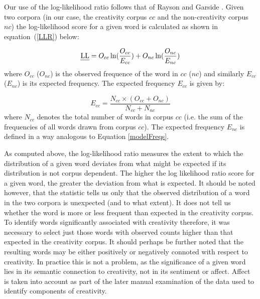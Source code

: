 \documentclass[10pt,letterpaper]{article}
\begin{document}
Our use of the log-likelihood ratio follows that of Rayson and Garside \cite{rayson00}.
Given two corpora (in our case, the creativity corpus $cc$ and the non-creativity corpus $nc$) the log-likelihood score for a given word is calculated as shown in equation~(\ref{LLR}) below:

\begin{equation}
\mbox{\em LL} =  O_{cc}\ln (\frac{O_{cc}}{E_{cc}} ) + O_{nc}\ln (\frac{O_{nc}}{E_{nc}} )
\label{LLR} 
\end{equation}
\noindent
where $O_{cc}$ ($O_{nc}$) is the observed frequence of the word in $cc$ ($nc$) and similarly $E_{cc}$ ($E_{nc}$) is its expected frequency. The expected frequency $E_{cc}$  is given by: 

\begin{equation}
E_{cc} = \frac{N_{cc} \times (O_{cc} + O_{nc})}{N_{cc} + N_{nc}}
\label{modelFreqs} 
\end{equation}
where $N_{cc}$ denotes the total number of words in corpus $cc$ (i.e. the sum of the frequencies of all words drawn from corpus $cc$). The expected frequency $E_{nc}$ is defined in a way analogous to Equation \ref{modelFreqs}.

As computed above, the log-likelihood ratio measures the extent to which the distribution of a given word deviates from what might be expected if its distribution is not corpus dependent. The higher the log likelihood ratio score for a given word, the greater the deviation from what is expected. It should be noted however, that the statistic tells us only that  the observed distribution of a word in the two corpora is unexpected (and to what extent).  It does not  tell us whether the word is more or less frequent than expected in the creativity corpus. To identify words significantly associated with creativity therefore, it was necessary to select just those words with observed counts higher than that expected in the creativity corpus. It should perhaps be further noted that the resulting words may be either positively or negatively connoted with respect to creativity. In practice this is not a problem, as the significance of a given word lies in its semantic connection to creativity, not in its sentiment or affect. Affect is taken into account as part of the later manual examination of the data used to identify components of creativity.
\end{document}
